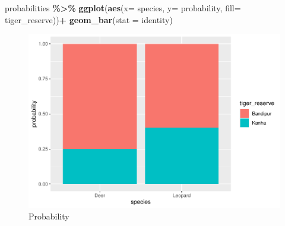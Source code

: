\documentclass[
]{book}
\newenvironment{Shaded}{\begin{snugshade}}{\end{snugshade}}
\newcommand{\AttributeTok}[1]{\textcolor[rgb]{0.13,0.29,0.53}{#1}}
\newcommand{\FunctionTok}[1]{\textcolor[rgb]{0.13,0.29,0.53}{\textbf{#1}}}
\newcommand{\NormalTok}[1]{#1}
\newcommand{\SpecialCharTok}[1]{\textcolor[rgb]{0.81,0.36,0.00}{\textbf{#1}}}
\newcommand{\StringTok}[1]{\textcolor[rgb]{0.31,0.60,0.02}{#1}}
\begin{document}
\begin{Shaded}
\begin{Highlighting}[]
\NormalTok{probabilities }\SpecialCharTok{\%\textgreater{}\%} \FunctionTok{ggplot}\NormalTok{(}\FunctionTok{aes}\NormalTok{(}\AttributeTok{x=}\NormalTok{ species, }\AttributeTok{y=}\NormalTok{ probability, }\AttributeTok{fill=}\NormalTok{ tiger\_reserve))}\SpecialCharTok{+}
  \FunctionTok{geom\_bar}\NormalTok{(}\AttributeTok{stat =} \StringTok{\textquotesingle{}identity\textquotesingle{}}\NormalTok{)}
\end{Highlighting}
\end{Shaded}

\begin{figure}
\centering
\includegraphics{_main_files/figure-latex/unnamed-chunk-73-1.pdf}
\caption{\label{fig:unnamed-chunk-73}Probability}
\end{figure}

  
\end{document}

